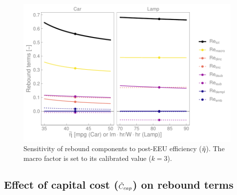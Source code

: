 \documentclass[12pt]{article}\usepackage[]{graphicx}\usepackage[]{xcolor}
\makeatletter
\def\maxwidth{ %
  \ifdim\Gin@nat@width>\linewidth
    \linewidth
  \else
    \Gin@nat@width
  \fi
}
\newenvironment{kframe}{%
 \def\at@end@of@kframe{}%
 \ifinner\ifhmode%
  \def\at@end@of@kframe{\end{minipage}}%
  \begin{minipage}{\columnwidth}%
 \fi\fi%
 \def\FrameCommand##1{\hskip\@totalleftmargin \hskip-\fboxsep
 \colorbox{shadecolor}{##1}\hskip-\fboxsep
     \hskip-\linewidth \hskip-\@totalleftmargin \hskip\columnwidth}%
 \MakeFramed {\advance\hsize-\width
   \@totalleftmargin\z@ \linewidth\hsize
   \@setminipage}}%
 {\par\unskip\endMakeFramed%
 \at@end@of@kframe}
\newenvironment{knitrout}{}{} %
\makeatother
\begin{document}
\begin{knitrout}
\color{fgcolor}\begin{kframe}


{\ttfamily\noindent\color{warningcolor}{\#\# Warning: The `legend.text.align` argument of `theme()` is deprecated as of ggplot2\\\#\# 3.5.0.\\\#\# i Please use theme(legend.text = element\_text(hjust)) instead.\\\#\# This warning is displayed once every 8 hours.\\\#\# Call `lifecycle::last\_lifecycle\_warnings()` to see where this warning was\\\#\# generated.}}\end{kframe}\begin{figure}

{\centering \includegraphics[width=\maxwidth]{figure/all_Re_terms_eta_graph-1} 

}

\caption[Sensitivity of rebound components to post-EEU efficiency ($\amacro{\eta}$)]{Sensitivity of rebound components to post-EEU efficiency ($\amacro{\eta}$). The macro factor is set to its calibrated value ($k = 3$).}\label{fig:all_Re_terms_eta_graph}
\end{figure}

\end{knitrout}


\subsection{Effect of capital cost ($\tilde{C}_{cap}$) on rebound terms} 
\label{sec:effect_of_capital_cost}
\end{document}
